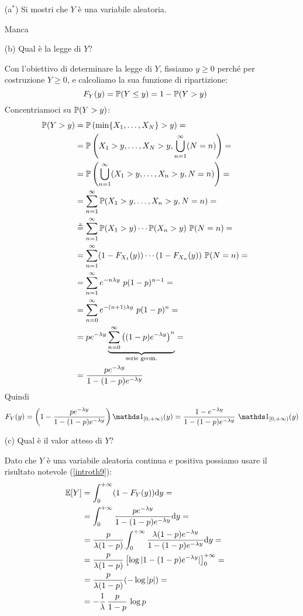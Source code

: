 \Soluzione{}
\begin{enumerate}
\item [(a$^*$)] Si mostri che $Y$ è una variabile aleatoria.

Manca %

\item [(b)] Qual è la legge di $Y$?

Con l'obiettivo di determinare la legge di $Y$, fissiamo $y\geq 0$ perché per costruzione $Y\geq 0$, e calcoliamo la sua funzione di ripartizione:
\[
F_Y(y)=\mathbb{P}(Y\leq y)=1-\mathbb{P}(Y>y)
\]
Concentriamoci su $\mathbb{P}(Y>y)$:
\begin{gather*}
\begin{aligned}
\PP(Y>y)&=\PP\left(\min\{X_1,\dots,X_N  \}>y  \right)=\\
&=\PP\left(X_1>y,\dots,X_N>y,\bigcup_{n=1}^\infty (N=n)  \right)=\\
&=\PP\left(\bigcup_{n=1}^\infty(X_1>y,\dots,X_n>y, N=n)  \right)=\\
&=\sum_{n=1}^\infty \PP(X_1>y,\dots,X_n>y, N=n)=\\
&\overset{\underset{\indep}{}}{=}\sum_{n=1}^\infty \PP(X_1>y)\cdots\PP(X_n>y)\ \PP(N=n)=\\
&=\sum_{n=1}^\infty (1-F_{X_1}(y))\cdots (1-F_{X_n}(y))\ \PP(N=n)=\\
&=\sum_{n=1}^\infty e^{-n\lambda y}\ p(1-p)^{n-1}=\\
&=\sum_{n=0}^\infty e^{-(n+1)\lambda y}\ p(1-p)^{n}=\\
&=pe^{-\lambda y} \underbrace{\sum_{n=0}^\infty \left((1-p)e^{-\lambda y}  \right)^n}_{\text{serie geom.}}=\\
&=\frac{pe^{-\lambda y}}{1-(1-p)e^{-\lambda y}}
\end{aligned}
\end{gather*}
Quindi
\[
F_Y(y)=\left(1-\frac{pe^{-\lambda y}}{1-(1-p)e^{-\lambda y}}  \right)\Ind_{[0,+\infty)}(y)=\frac{1-e^{-\lambda y}}{1-(1-p)e^{-\lambda y}}\ \Ind_{[0,+\infty)}(y)
\]

\item [(c)] Qual è il valor atteso di $Y$? 

Dato che $Y$ è una variabile aleatoria continua e positiva possiamo usare il risultato notevole (\ref{introth9}):
\begin{gather*}
\begin{aligned}
\mathbb{E}[Y]&=\int_0^{+\infty}(1-F_Y(y))\mathrm{d} y=\\
&=\int_{0}^{+\infty} \frac{pe^{-\lambda y}}{1-(1-p)e^{-\lambda y}}\mathrm{d} y=\\
&=\frac{p}{\lambda(1-p)}\int_{0}^{+\infty} \frac{\lambda(1-p)e^{-\lambda y}}{1-(1-p)e^{-\lambda y}}\mathrm{d} y=\\
&=\frac{p}{\lambda(1-p)}\left[\log |1-(1-p)e^{-\lambda y}|  \right]_0^{+\infty}=\\
&=\frac{p}{\lambda(1-p)}(-\log |p|)=\\
&=-\frac{1}{\lambda}\, \frac{p}{1-p}\, \log p
\end{aligned}
\end{gather*}

\end{enumerate}

